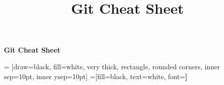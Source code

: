 \documentclass[a4paper]{article}
\title{Git Cheat Sheet}
\begin{document}
\begin{center}
	\LARGE{\textcolor{goldenyellow}{\textbf{Git Cheat Sheet}}} \\
\end{center}

\footnotesize
\begin{multicols*}{3}

 = [draw=black, fill=white, very thick,
    rectangle, rounded corners, inner sep=10pt, inner ysep=10pt]
 =[fill=black, text=white, font=\bfseries]




\end{multicols*}
\end{document}
